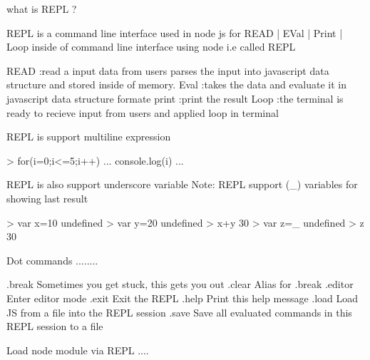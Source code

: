 
what is REPL ?

 REPL is a command line interface used in node js for READ | EVal | Print | Loop inside of command line interface using node i.e called REPL

 READ :read a input data from users parses the input into javascript data structure and stored inside of memory.
 Eval :takes the data and evaluate it in javascript data structure formate
 print :print the result
 Loop :the terminal is ready to recieve input from users and applied loop in terminal 


 REPL is support multiline expression 
  
  > for(i=0;i<=5;i++){
... console.log(i)
... }


  REPL is also support underscore variable
  Note: REPL support (_) variables for showing last result 

  > var x=10
undefined
> var y=20
undefined
> x+y
30
> var z=_
undefined
> z
30


Dot commands ........

.break    Sometimes you get stuck, this gets you out
.clear    Alias for .break
.editor   Enter editor mode
.exit     Exit the REPL
.help     Print this help message
.load     Load JS from a file into the REPL session
.save     Save all evaluated commands in this REPL session to a file


Load node module via REPL ....




